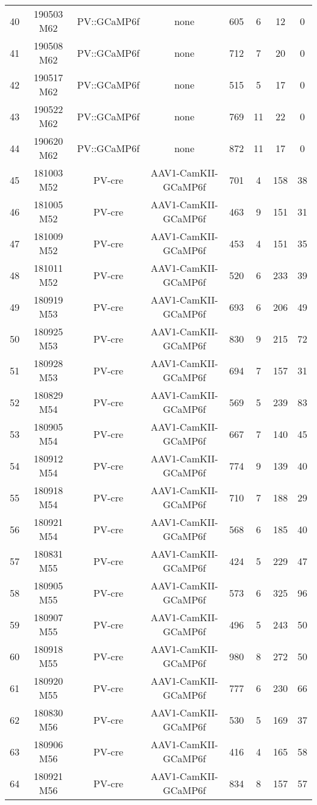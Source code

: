 \begin{table}[htbp]
\begin{tabular}{lccccccc}
    40    & 190503 M62 & PV::GCaMP6f & none  & 605   & 6     & 12    & 0 \\
    41    & 190508 M62 & PV::GCaMP6f & none  & 712   & 7     & 20    & 0 \\
    42    & 190517 M62 & PV::GCaMP6f & none  & 515   & 5     & 17    & 0 \\
    43    & 190522 M62 & PV::GCaMP6f & none  & 769   & 11    & 22    & 0 \\
    44    & 190620 M62 & PV::GCaMP6f & none  & 872   & 11    & 17    & 0 \\
    45    & 181003 M52 & PV-cre & AAV1-CamKII-GCaMP6f & 701   & 4     & 158   & 38 \\
    46    & 181005 M52 & PV-cre & AAV1-CamKII-GCaMP6f & 463   & 9     & 151   & 31 \\
    47    & 181009 M52 & PV-cre & AAV1-CamKII-GCaMP6f & 453   & 4     & 151   & 35 \\
    48    & 181011 M52 & PV-cre & AAV1-CamKII-GCaMP6f & 520   & 6     & 233   & 39 \\
    49    & 180919 M53 & PV-cre & AAV1-CamKII-GCaMP6f & 693   & 6     & 206   & 49 \\
    50    & 180925 M53 & PV-cre & AAV1-CamKII-GCaMP6f & 830   & 9     & 215   & 72 \\
    51    & 180928 M53 & PV-cre & AAV1-CamKII-GCaMP6f & 694   & 7     & 157   & 31 \\
    52    & 180829 M54 & PV-cre & AAV1-CamKII-GCaMP6f & 569   & 5     & 239   & 83 \\
    53    & 180905 M54 & PV-cre & AAV1-CamKII-GCaMP6f & 667   & 7     & 140   & 45 \\
    54    & 180912 M54 & PV-cre & AAV1-CamKII-GCaMP6f & 774   & 9     & 139   & 40 \\
    55    & 180918 M54 & PV-cre & AAV1-CamKII-GCaMP6f & 710   & 7     & 188   & 29 \\
    56    & 180921 M54 & PV-cre & AAV1-CamKII-GCaMP6f & 568   & 6     & 185   & 40 \\
    57    & 180831 M55 & PV-cre & AAV1-CamKII-GCaMP6f & 424   & 5     & 229   & 47 \\
    58    & 180905 M55 & PV-cre & AAV1-CamKII-GCaMP6f & 573   & 6     & 325   & 96 \\
    59    & 180907 M55 & PV-cre & AAV1-CamKII-GCaMP6f & 496   & 5     & 243   & 50 \\
    60    & 180918 M55 & PV-cre & AAV1-CamKII-GCaMP6f & 980   & 8     & 272   & 50 \\
    61    & 180920 M55 & PV-cre & AAV1-CamKII-GCaMP6f & 777   & 6     & 230   & 66 \\
    62    & 180830 M56 & PV-cre & AAV1-CamKII-GCaMP6f & 530   & 5     & 169   & 37 \\
    63    & 180906 M56 & PV-cre & AAV1-CamKII-GCaMP6f & 416   & 4     & 165   & 58 \\
    64    & 180921 M56 & PV-cre & AAV1-CamKII-GCaMP6f & 834   & 8     & 157   & 57 \\
    \end{tabular}%

  \label{tab:expTable}%
\end{table}%

